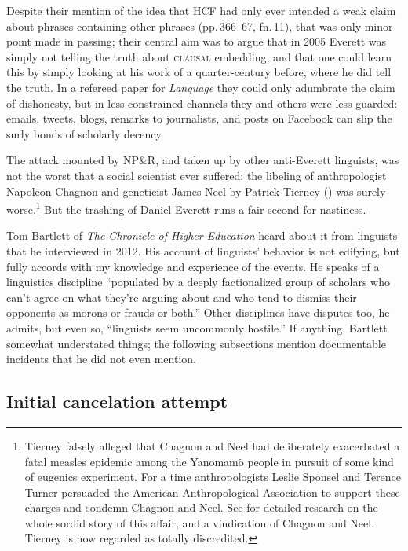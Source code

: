 \documentclass[output=paper,colorlinks,citecolor=brown
]{langscibook}
\begin{document}
Despite their mention of the idea that HCF had only ever intended a
weak claim about phrases containing other phrases (pp.\,366--67,
fn.\,11), that was only minor point made in passing; their central
aim was to argue that in 2005 Everett was simply not telling the truth
about \textsc{clausal} embedding, and that one could learn this by
simply looking at his work of a quarter-century before, where he did
tell the truth. In a refereed paper for \textit{Language} they could
only adumbrate the claim of dishonesty, but in less constrained
channels they and others were less guarded: emails, tweets, blogs,
remarks to journalists, and posts on Facebook can slip the surly bonds
of scholarly decency.

The attack mounted by NP\&R, and taken up by other anti-Everett
linguists, was not the worst that a social scientist ever suffered;
the libeling of anthropologist Napoleon Chagnon and geneticist James
Neel by Patrick Tierney (\citeyear{Tierney00}) was surely worse.\footnote{%
   Tierney falsely alleged that Chagnon and Neel had deliberately
   exacerbated a fatal measles epidemic among the Yanomam{\"o} people
   in pursuit of some kind of eugenics experiment. For a time
   anthropologists Leslie Sponsel and Terence Turner persuaded the
   American Anthropological Association to support these charges and
   condemn Chagnon and Neel. See \citealt{Dreger11} for detailed
   research on the whole sordid story of this affair, and a vindication
   of Chagnon and Neel. Tierney is now regarded as totally discredited.}
But the trashing of Daniel Everett runs a fair second for nastiness.

Tom Bartlett of \textit{The Chronicle of Higher Education} heard
about it from linguists that he interviewed in 2012. His account of
linguists' behavior \citep{Bartlett12} is not edifying, but fully
accords with my knowledge and experience of the events. He speaks
of a linguistics discipline ``populated by a deeply factionalized
group of scholars who can't agree on what they're arguing about
and who tend to dismiss their opponents as morons or frauds or both.''
Other disciplines have disputes too, he admits, but even so,
``linguists seem uncommonly hostile.'' If anything, Bartlett somewhat
understated things; the following subsections mention documentable
incidents that he did not even mention.

\subsection{Initial cancelation attempt}\label{river}
\end{document}
